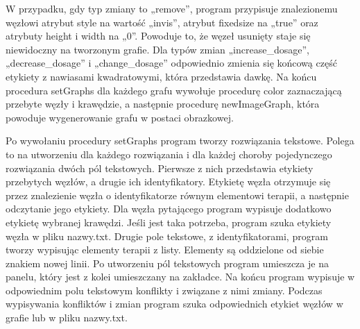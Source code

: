 W przypadku, gdy typ zmiany to „remove”, program przypisuje znalezionemu węzłowi atrybut style na wartość „invis”, atrybut fixedsize na „true” oraz atrybuty height i width na „0”. Powoduje to, że węzeł usunięty staje się niewidoczny na tworzonym grafie. Dla typów zmian „increase\_dosage”, „decrease\_dosage” i „change\_dosage” odpowiednio zmienia się końcową część etykiety z nawiasami kwadratowymi, która przedstawia dawkę. Na końcu procedura setGraphs dla każdego grafu wywołuje procedurę color zaznaczającą przebyte węzły i krawędzie, a następnie procedurę newImageGraph, która powoduje wygenerowanie grafu w postaci obrazkowej. 

Po wywołaniu procedury setGraphs program tworzy rozwiązania tekstowe. Polega to na utworzeniu dla każdego rozwiązania i dla każdej choroby pojedynczego rozwiązania dwóch pól tekstowych. Pierwsze z nich przedstawia etykiety przebytych węzłów, a drugie ich identyfikatory. 
Etykietę węzła otrzymuje się przez znalezienie węzła o identyfikatorze równym elementowi terapii, a następnie odczytanie jego etykiety. Dla węzła pytającego program wypisuje dodatkowo etykietę wybranej krawędzi. Jeśli jest taka potrzeba, program szuka etykiety węzła w pliku nazwy.txt. Drugie pole tekstowe, z identyfikatorami, program tworzy wypisując elementy terapii z listy. Elementy są oddzielone od siebie znakiem nowej linii. 
Po utworzeniu pól tekstowych program umieszcza je na panelu, który jest z kolei umieszczany na zakładce. Na końcu program wypisuje w odpowiednim polu tekstowym konflikty i związane z nimi zmiany. Podczas wypisywania konfliktów i zmian program szuka odpowiednich etykiet węzłów w grafie lub w pliku nazwy.txt. 

